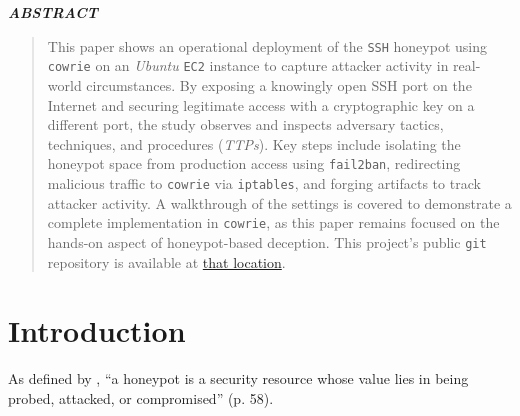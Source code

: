 \documentclass{cls/ULBreport}
\renewenvironment{abstract}{%
  \clearpage
  \thispagestyle{plain}
  \begin{center}
    \bfseries\itshape ABSTRACT
  \end{center}
  \vspace{0.5cm}
  \begin{quote}
    \itshape
    \justifying
}{%
  \end{quote}
  \clearpage
}
\begin{document}
    
    \renewcommand{\rmdefault}{cmr} %
    \renewcommand{\sfdefault}{cmss} %
    \renewcommand{\ttdefault}{cmtt} %
    
    \makeatletter
    \renewcommand{\reset@font}{\normalfont\@setfontsize\f@size{12}{14.4}}
    \makeatother
    \normalfont


    \begin{abstract}        
    This paper shows an operational deployment of the \texttt{SSH} honeypot using \texttt{cowrie} on an \textit{Ubuntu} \texttt{EC2} instance to capture attacker activity in real-world circumstances. By exposing a knowingly open SSH port on the Internet and securing legitimate access with a cryptographic key on a different port, the study observes and inspects adversary tactics, techniques, and procedures (\textit{TTPs}). Key steps include isolating the honeypot space from production access using \texttt{fail2ban}, redirecting malicious traffic to \texttt{cowrie} via \texttt{iptables}, and forging artifacts to track attacker activity. A walkthrough of the settings is covered to demonstrate a complete implementation in \texttt{cowrie}, as this paper remains focused on the hands-on aspect of honeypot-based deception. This project's public \texttt{git} repository is available at \href{https://github.com/nottoBD/netsec-cowrie-honey}{that location}.
    \end{abstract}
    \newpage


    \section{Introduction}

As defined by \citet{spitzner2002honeypots}, 
\enquote{a honeypot is a security resource whose value lies in being probed, attacked, or compromised} (p. 58).
\end{document}
